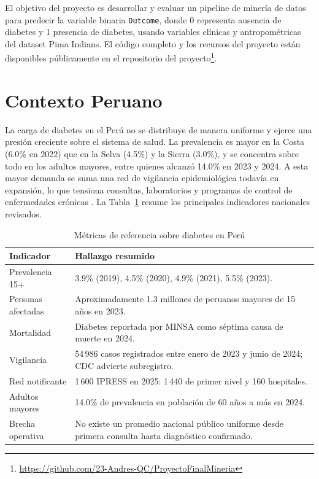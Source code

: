 \documentclass[conference]{IEEEtran}
\newcommand{\code}[1]{\texttt{#1}}
\begin{document}
El objetivo del proyecto es desarrollar y evaluar un pipeline de minería de datos para predecir la variable binaria \code{Outcome}, donde 0 representa ausencia de diabetes y 1 presencia de diabetes, usando variables clínicas y antropométricas del dataset Pima Indians. El código completo y los recursos del proyecto están disponibles públicamente en el repositorio del proyecto\footnote{\url{https://github.com/23-Andres-QC/ProyectoFinalMineria}}.

\section{Contexto Peruano}

La carga de diabetes en el Perú no se distribuye de manera uniforme y ejerce una presión creciente sobre el sistema de salud. La prevalencia es mayor en la Costa (6.0\% en 2022) que en la Selva (4.5\%) y la Sierra (3.0\%), y se concentra sobre todo en los adultos mayores, entre quienes alcanzó 14.0\% en 2023 y 2024. A esta mayor demanda se suma una red de vigilancia epidemiológica todavía en expansión, lo que tensiona consultas, laboratorios y programas de control de enfermedades crónicas \cite{pp0018,inei_adulto_mayor}. La Tabla~\ref{tab:contexto_peru} resume los principales indicadores nacionales revisados.

\begin{table}[H]
\centering
\caption{Métricas de referencia sobre diabetes en Perú}
\label{tab:contexto_peru}
\scriptsize
\begin{tabularx}{\columnwidth}{@{}lX@{}}
\toprule
\textbf{Indicador} & \textbf{Hallazgo resumido} \\
\midrule
Prevalencia 15+ & 3.9\% (2019), 4.5\% (2020), 4.9\% (2021), 5.5\% (2023). \\
Personas afectadas & Aproximadamente 1.3 millones de peruanos mayores de 15 años en 2023. \\
Mortalidad & Diabetes reportada por MINSA como séptima causa de muerte en 2024. \\
Vigilancia & 54\,986 casos registrados entre enero de 2023 y junio de 2024; CDC advierte subregistro. \\
Red notificante & 1\,600 IPRESS en 2025: 1\,440 de primer nivel y 160 hospitales. \\
Adultos mayores & 14.0\% de prevalencia en población de 60 años a más en 2024. \\
Brecha operativa & No existe un promedio nacional público uniforme desde primera consulta hasta diagnóstico confirmado. \\
\bottomrule
\end{tabularx}
\end{table}
\end{document}
